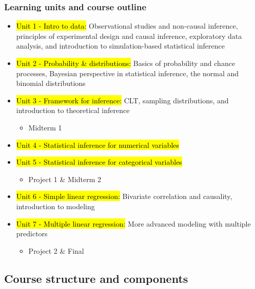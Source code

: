 \documentclass[11pt,containsverbatim,handout,xcolor=xelatex,dvipsnames,table]{beamer}
\begin{document}
\begin{frame}
\frametitle{Learning units and course outline}

{\footnotesize
\begin{itemize}[<+->]
\item \hl{Unit 1 - Intro to data:} Observational studies and non-causal inference, principles of experimental design and causal inference, exploratory data analysis, and introduction to simulation-based statistical inference
\item \hl{Unit 2 - Probability \& distributions:} Basics of probability and chance processes, Bayesian perspective in statistical inference, the normal and binomial distributions
\item \hl{Unit 3 - Framework for inference:} CLT, sampling distributions, and introduction to theoretical inference
\begin{itemize}
\item Midterm 1
\end{itemize}
\item \hl{Unit 4 - Statistical inference for numerical variables}
\item \hl{Unit 5 - Statistical inference for categorical variables}
\begin{itemize}
\item Project 1 \& Midterm 2
\end{itemize}
\item \hl{Unit 6 - Simple linear regression:} Bivariate correlation and causality, introduction to modeling
\item \hl{Unit 7 - Multiple linear regression:} More advanced modeling with multiple predictors
\begin{itemize}
\item Project 2 \& Final
\end{itemize}
\end{itemize}
}

\end{frame}


\subsection{Course structure and components}

\end{document}
